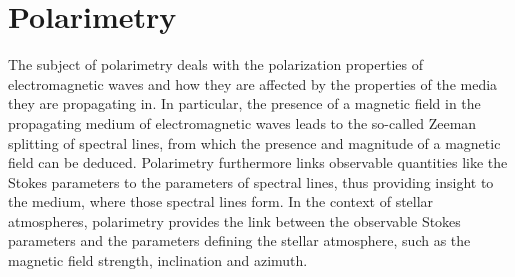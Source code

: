 \documentclass[a4paper,11pt]{report}
\begin{document}
\section{Polarimetry}
The subject of polarimetry deals with the polarization properties of electromagnetic waves and how they are affected by the properties of the media they are propagating in. In particular, the presence of a magnetic field in the propagating medium of electromagnetic waves leads to the so-called Zeeman splitting of spectral lines, from which the presence and magnitude of a magnetic field can be deduced. Polarimetry furthermore links observable quantities like the Stokes parameters to the parameters of spectral lines, thus providing insight to the medium, where those spectral lines form. In the context of stellar atmospheres, polarimetry provides the link between the observable Stokes parameters and the parameters defining the stellar atmosphere, such as the magnetic field strength, inclination and azimuth.
\end{document}
